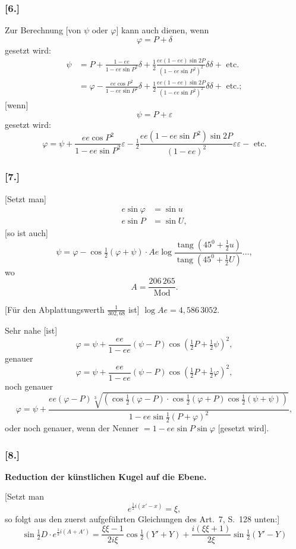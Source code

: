 \documentclass[12pt,a4paper]{article}
\theoremstyle{plain}
\theoremstyle{definition}
\theoremstyle{remark}
\newcommand{\tang}{\operatorname{tang}}
\newcommand{\ee}{\mathit{ee}}
\newcommand{\Mod}{\operatorname{Mod}}
\begin{document}
\subsubsection*{[6.]}
Zur Berechnung [von $\psi$ oder $\varphi$] kann auch dienen, wenn
\[
\varphi = P + \delta
\]
gesetzt wird:
\[
\begin{aligned}
\psi &= P + \frac{1 - \ee}{1 - \ee\sin P^2}\delta + \tfrac{1}{2}\frac{\ee(1 - \ee)\sin 2P}{(1 - \ee\sin P^2)^2}\delta\delta + \text{ etc.} \\
&= \varphi - \frac{\ee\cos P^2}{1 - \ee\sin P^2}\delta + \tfrac{1}{2}\frac{\ee(1 - \ee)\sin 2P}{(1 - \ee\sin P^2)^2}\delta\delta + \text{ etc.};
\end{aligned}
\]
[wenn]
\[
\psi = P + \varepsilon
\]
gesetzt wird:
\[
\varphi = \psi + \frac{\ee\cos P^2}{1 - \ee\sin P^2}\varepsilon - \tfrac{1}{2}\frac{\ee(1 - \ee\sin P^2)\sin 2P}{(1 - \ee)^2}\varepsilon\varepsilon - \text{ etc.}
\]

\subsubsection*{[7.]}
[Setzt man]
\[
\begin{aligned}
e\sin\varphi &= \sin u \\
e\sin P &= \sin U,
\end{aligned}
\]
[so ist auch]
\[
\psi = \varphi - \cos\tfrac{1}{2}(\varphi + \psi) \cdot Ae\log\frac{\tang(45^0 + \tfrac{1}{2}u)}{\tang(45^0 + \tfrac{1}{2}U)} \ldots,
\]
wo
\[
A = \frac{206\,265}{\Mod}.
\]

[Für den Abplattungswerth $\frac{1}{302{,}68}$ ist] $\log Ae = 4{,}586\,3052$.

Sehr nahe [ist]
\[
\varphi = \psi + \frac{\ee}{1 - \ee}(\psi - P)\cos(\tfrac{1}{2}P + \tfrac{1}{2}\psi)^2,
\]
genauer
\[
\varphi = \psi + \frac{\ee}{1 - \ee}(\psi - P)\cos(\tfrac{1}{2}P + \tfrac{1}{2}\varphi)^2,
\]
noch genauer
\[
\varphi = \psi + \frac{\ee(\varphi - P)\sqrt[3]{(\cos\tfrac{1}{2}(\varphi - P)\cdot\cos\tfrac{1}{2}(\varphi + P)\cos\tfrac{1}{2}(\psi + \psi))}}{1 - \ee\sin\tfrac{1}{2}(P + \varphi)^2},
\]
oder noch genauer, wenn der Nenner $= 1 - \ee\sin P\sin\varphi$ [gesetzt wird].

\subsubsection*{[8.]}
\textbf{Reduction der künstlichen Kugel auf die Ebene.}

[Setzt man
\[
e^{\frac{1}{2}i(x' - x)} = \xi,
\]
so folgt aus den zuerst aufgeführten Gleichungen des Art.~7, S.~128 unten:]
\[
\sin\tfrac{1}{2}D \cdot e^{\frac{1}{2}i(A + A')} = \frac{\xi\xi - 1}{2i\xi}\cos\tfrac{1}{2}(Y' + Y) + \frac{i(\xi\xi + 1)}{2\xi}\sin\tfrac{1}{2}(Y' - Y)
\]
\end{document}
